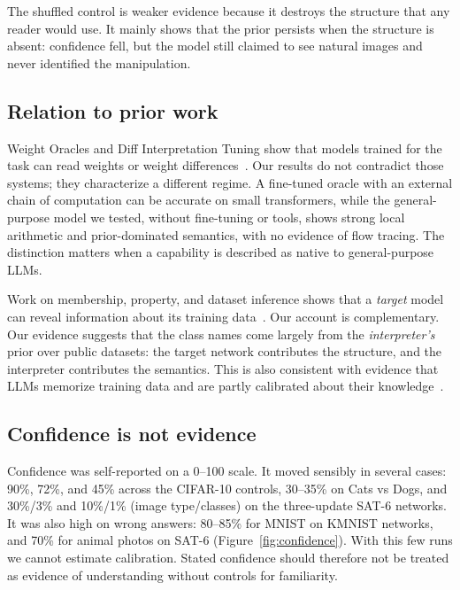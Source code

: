 \documentclass[11pt]{article}
\begin{document}
The shuffled control is weaker evidence because it destroys the structure that any reader would use. It mainly shows that the prior persists when the structure is absent: confidence fell, but the model still claimed to see natural images and never identified the manipulation.

\subsection{Relation to prior work}

Weight Oracles and Diff Interpretation Tuning show that models trained for the task can read weights or weight differences~\cite{goel,kabra}. Our results do not contradict those systems; they characterize a different regime. A fine-tuned oracle with an external chain of computation can be accurate on small transformers, while the general-purpose model we tested, without fine-tuning or tools, shows strong local arithmetic and prior-dominated semantics, with no evidence of flow tracing. The distinction matters when a capability is described as native to general-purpose LLMs.

Work on membership, property, and dataset inference shows that a \emph{target} model can reveal information about its training data~\cite{ganju,maini,shokri}. Our account is complementary. Our evidence suggests that the class names come largely from the \emph{interpreter's} prior over public datasets: the target network contributes the structure, and the interpreter contributes the semantics. This is also consistent with evidence that LLMs memorize training data and are partly calibrated about their knowledge~\cite{carliniExtract,carliniQuant,kadavath}.

\subsection{Confidence is not evidence}

Confidence was self-reported on a 0--100 scale. It moved sensibly in several cases: 90\%, 72\%, and 45\% across the CIFAR-10 controls, 30--35\% on Cats vs Dogs, and 30\%/3\% and 10\%/1\% (image type/classes) on the three-update SAT-6 networks. It was also high on wrong answers: 80--85\% for MNIST on KMNIST networks, and 70\% for animal photos on SAT-6 (Figure~\ref{fig:confidence}). With this few runs we cannot estimate calibration. Stated confidence should therefore not be treated as evidence of understanding without controls for familiarity.
\end{document}
